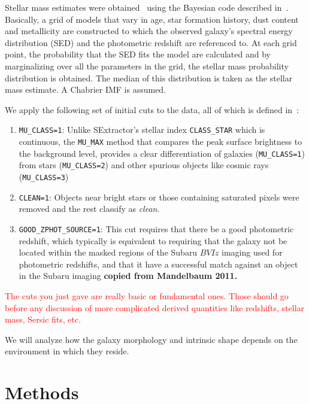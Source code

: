 \documentclass[twocolumn,useAMS,usenatbib]{mn2e}
\newcommand{\rachel}[1]{{\textcolor{red}{#1}}}
\begin{document}
Stellar mass estimates were obtained~\citep{COSMOS_XRAY} using the Bayesian code described in~\cite{KEVIN_MSTAR}. Basically, a grid of models that vary in age, star formation history, dust content and metallicity
are constructed to which the observed galaxy's spectral energy distribution (SED) and the photometric redshift are referenced to. At each grid point, the probability that the 
SED fits the model are calculated and by marginalizing over all the parameters in the grid, the stellar mass probability distribution is obtained. The median of this distribution
is taken as the stellar mass estimate. A Chabrier IMF is assumed.


We apply the following set of initial cuts to the data, all of which is defined in~\cite{COSMOS_Alexie}:
\begin{enumerate}
 \item \texttt{MU\_CLASS=1}: Unlike SExtractor's stellar index \texttt{CLASS\_STAR} which is continuous, the \texttt{MU\_MAX} method that compares the peak surface brightness to the background level,
 provides a clear differentiation of galaxies (\texttt{MU\_CLASS=1}) from stars (\texttt{MU\_CLASS=2}) and other spurious objects like cosmic rays (\texttt{MU\_CLASS=3})
 
 \item \texttt{CLEAN=1}: Objects near bright stars or those containing saturated pixels were removed and the rest classify as \emph{clean}.
 
 \item \texttt{GOOD\_ZPHOT\_SOURCE=1}: This cut requires that there be a good photometric redshift, which typically is equivalent to requiring that the galaxy not be located within
                                       the masked regions of the Subaru $BVIz$ imaging used for photometric redshifts, and that it have a successful match against an object in the Subaru imaging
                                       {\bf copied from Mandelbaum 2011.}
\end{enumerate}
\rachel{The cuts you just gave are really basic or fundamental ones.  Those should go before any discussion of more complicated derived quantities like redshifts, stellar mass, Sersic fits, etc.}
  
We will analyze how the galaxy morphology and intrinsic shape depends on
the environment in which they reside.

\section{Methods}
\label{S:methods}
\end{document}
